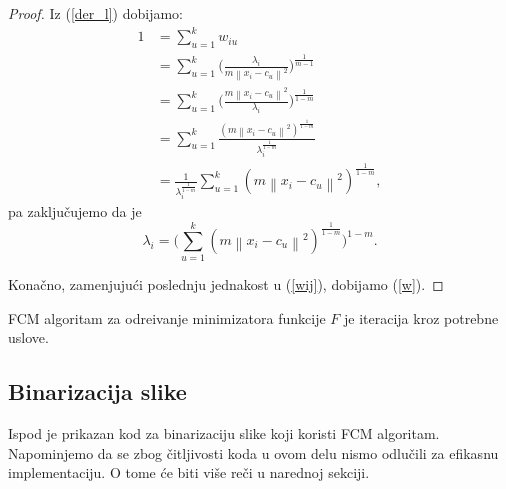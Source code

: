 \documentclass[12pt,a4paper]{article}
\theoremstyle{definition}
\theoremstyle{remark}
\theoremstyle{plain}
\begin{document}
\begin{proof}
Iz (\ref{der_l}) dobijamo:
\begin{align*}
  1&=\sum_{u=1}^{k}w_{iu}\\
   &=\sum_{u=1}^{k}\biggl(\frac{\lambda_{i}}{m\left\|x_{i}-c_{u}\right\|^{2}}\biggr)^{\frac{1}{m-1}}\\
   &=\sum_{u=1}^{k}\biggl(\frac{m\left\|x_{i}-c_{u}\right\|^{2}}{\lambda_{i}}\biggr)^{\frac{1}{1-m}}\\
   &=\sum_{u=1}^{k}\frac{(m\left\|x_{i}-c_{u}\right\|^{2})^{\frac{1}{1-m}}}{\lambda_{i}^{\frac{1}{1-m}}}\\
   &=\frac{1}{\lambda_{i}^{\frac{1}{1-m}}}\sum_{u=1}^{k}(m\left\|x_{i}-c_{u}\right\|^{2})^{\frac{1}{1-m}},
\end{align*}
pa zaklju\v cujemo da je
\begin{equation*}
  \lambda_{i} = \biggl(\sum_{u=1}^{k}(m\left\|x_{i}-c_{u}\right\|^{2})^{\frac{1}{1-m}}\biggr)^{1-m}.
\end{equation*}

Kona\v cno, zamenjuju\' ci poslednju jednakost u (\ref{wij}), dobijamo (\ref{w}). 
\end{proof}

FCM algoritam za odre\dj ivanje minimizatora funkcije $F$ je iteracija kroz potrebne uslove.

\subsection{Binarizacija slike}
\label{sec:binarizacija}
Ispod je prikazan kod za binarizaciju slike koji koristi FCM algoritam. Napominjemo da se zbog \v citljivosti koda u ovom delu nismo odlu\v cili za efikasnu implementaciju. O tome \' ce biti vi\v se re\v ci u narednoj sekciji.

\inputminted[tabsize=2,breaklines]{cpp}{codes/latex/binarization.cpp}
\end{document}
